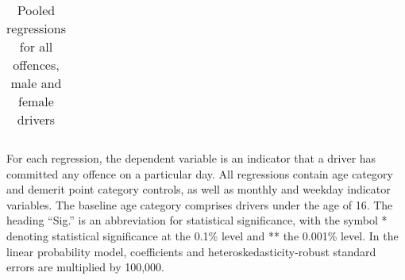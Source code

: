 \begin{table}
\begin{tabular}{l r r r l r r l}
%

\end{tabular} 
\caption{Pooled regressions for all offences, male and female drivers} 
For each regression, the dependent variable is an indicator that a driver has committed  
any offence on a particular day.  
All regressions contain age category and demerit point category controls, 
as well as monthly and weekday indicator variables. 
The baseline age category comprises drivers under the age of 16. 
The heading ``Sig.'' is an abbreviation for statistical significance, with 
the symbol * denoting statistical significance at the 0.1\% level 
and ** the 0.001\% level. 
In the linear probability model, coefficients and heteroskedasticity-robust standard errors are  
multiplied by 100,000.  
\label{tab:seas_Logit_vs_LPMx100K_pooled_regs} 
\end{table} 
 

